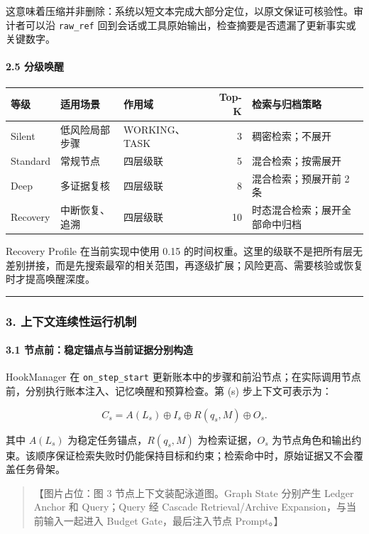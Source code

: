 \documentclass[UTF8,a4paper,12pt]{ctexart}
\begin{document}
这意味着压缩并非删除：系统以短文本完成大部分定位，以原文保证可核验性。审计者可以沿 \texttt{raw\_ref} 回到会话或工具原始输出，检查摘要是否遗漏了更新事实或关键数字。

\paragraph{2.5 分级唤醒}

\begin{longtable}[]{@{}lllrl@{}}
\toprule
等级 & 适用场景 & 作用域 & Top-K & 检索与归档策略 \\
\midrule
\endhead
Silent & 低风险局部步骤 & WORKING、TASK & 3 & 稠密检索；不展开 \\
Standard & 常规节点 & 四层级联 & 5 & 混合检索；按需展开 \\
Deep & 多证据复核 & 四层级联 & 8 & 混合检索；预展开前 2 条 \\
Recovery & 中断恢复、追溯 & 四层级联 & 10 & 时态混合检索；展开全部命中归档 \\
\bottomrule
\end{longtable}

Recovery Profile 在当前实现中使用 0.15 的时间权重。这里的级联不是把所有层无差别拼接，而是先搜索最窄的相关范围，再逐级扩展；风险更高、需要核验或恢复时才提高唤醒深度。

\begin{center}\rule{0.5\linewidth}{0.5pt}\end{center}

\subsubsection{3. 上下文连续性运行机制}

\paragraph{3.1 节点前：稳定锚点与当前证据分别构造}

HookManager 在 \texttt{on\_step\_start} 更新账本中的步骤和前沿节点；在实际调用节点前，分别执行账本注入、记忆唤醒和预算检查。第 (s) 步上下文可表示为：

\[
C_s=A(L_s)\oplus I_s\oplus R(q_s,M)\oplus O_s.
\]

其中 \(A(L_s)\) 为稳定任务锚点，\(R(q_s,M)\) 为检索证据，\(O_s\) 为节点角色和输出约束。该顺序保证检索失败时仍能保持目标和约束；检索命中时，原始证据又不会覆盖任务骨架。

\begin{quote}
【图片占位：图 3 节点上下文装配泳道图。Graph State 分别产生 Ledger Anchor 和 Query；Query 经 Cascade Retrieval/Archive Expansion，与当前输入一起进入 Budget Gate，最后注入节点 Prompt。】
\end{quote}
\end{document}
